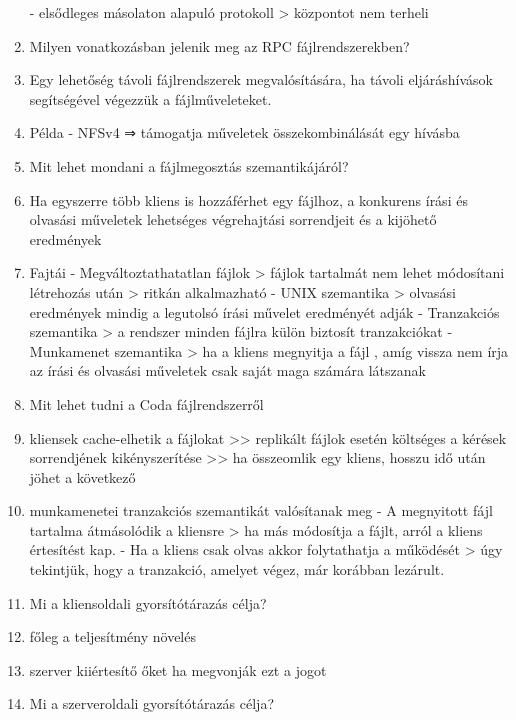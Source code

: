 \documentclass[twoside, a4paper, 12pt]{article}
\begin{document}
\begin{enumerate}
                - elsődleges másolaton alapuló protokoll
                > központot nem terheli
            \item  Milyen vonatkozásban jelenik meg az RPC fájlrendszerekben?
            \item Egy lehetőség távoli fájlrendszerek megvalósítására, ha távoli eljáráshívások segítségével végezzük a fájlműveleteket.
            \item Példa
                - NFSv4 ⇒ támogatja műveletek összekombinálását egy hívásba
            \item  Mit lehet mondani a fájlmegosztás szemantikájáról?  
            \item Ha egyszerre több kliens is hozzáférhet egy fájlhoz, a konkurens írási és olvasási műveletek lehetséges végrehajtási sorrendjeit és a kijöhető eredmények
            \item Fajtái
                - Megváltoztathatatlan fájlok
                > fájlok tartalmát nem lehet módosítani létrehozás után
                > ritkán alkalmazható
                - UNIX szemantika
                > olvasási eredmények mindig a legutolsó írási művelet eredményét adják
                - Tranzakciós szemantika
                > a rendszer minden fájlra külön biztosít tranzakciókat
                - Munkamenet szemantika
                > ha a kliens megnyitja a fájl , amíg vissza nem írja az írási és olvasási műveletek csak saját maga számára látszanak
            \item  Mit lehet tudni a Coda fájlrendszerről 
            \item kliensek cache-elhetik a fájlokat
                >> replikált fájlok esetén költséges a kérések sorrendjének kikényszerítése
                >> ha összeomlik egy kliens, hosszu idő után jöhet a következő
            \item munkamenetei tranzakciós szemantikát valósítanak meg
                - A megnyitott fájl tartalma átmásolódik a kliensre
                > ha más módosítja a fájlt, arról a kliens értesítést kap.
                - Ha a kliens csak olvas akkor folytathatja a működését 
                > úgy tekintjük, hogy a tranzakció, amelyet végez, már korábban lezárult.	
            \item  Mi a kliensoldali gyorsítótárazás célja?
            \item főleg a teljesítmény növelés
            \item szerver kiiértesítő őket ha megvonják ezt a jogot
            \item  Mi a szerveroldali gyorsítótárazás célja?

\end{enumerate}
\end{document}
